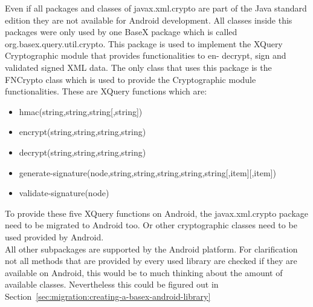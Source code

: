 Even if all packages and classes of javax.xml.crypto are part of the Java standard edition they are not available for Android development.
All classes inside this packages were only used by one BaseX package which is called org.basex.query.util.crypto.
This package is used to implement the XQuery Cryptographic module that provides functionalities to en- decrypt, sign and validated signed XML data.
The only class that uses this package is the FNCrypto class which is used to provide the Cryptographic module functionalities.
These are XQuery functions which are:
\begin{itemize}
  \item hmac(string,string,string[,string])
  \item encrypt(string,string,string,string)
  \item decrypt(string,string,string,string)
  \item generate-signature(node,string,string,string,string,string[,item][,item])
  \item validate-signature(node)
\end{itemize}
To provide these five XQuery functions on Android, the javax.xml.crypto package need to be migrated to Android too.
Or other cryptographic classes need to be used provided by Android.\\
All other subpackages are supported by the Android platform.
For clarification not all methods that are provided by every used library are checked if they are available on Android, this would be to much thinking about the amount of available classes.
Nevertheless this could be figured out in Section~\ref{sec:migration:creating-a-basex-android-library}

